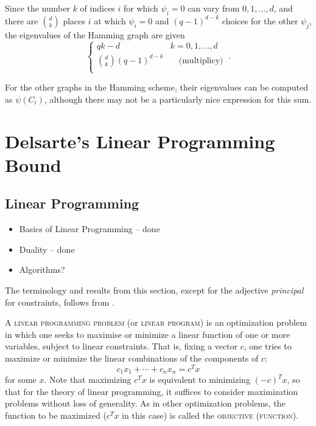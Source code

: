 \documentclass{report}
\begin{document}
    Since the number $k$ of indices $i$ for which $\psi_i = 0$
    can vary from $0, 1, \ldots, d$,
    and there are $\binom{d}{k}$ places $i$ at which $\psi_i = 0$
    and $(q - 1)^{d - k}$ choices for the other $\psi_j$,
    the eigenvalues of the Hamming graph are given
    \begin{equation}
      \begin{cases}
        qk - d & k = 0, 1, \ldots, d \\
        \binom{d}{k}(q - 1)^{d - k} & \quad\text{(multiplicy)} \\
      \end{cases} \ .
    \end{equation}

    For the other graphs in the Hamming scheme, their eigenvalues can be
    computed as $\psi(C_i)$, although there may not be a particularly nice
    expression for this sum.

\chapter{Delsarte's Linear Programming Bound}
  \section{Linear Programming}
    \begin{itemize}
      \item Basics of Linear Programming -- done
      \item Duality -- done
      \item Algorithms?
    \end{itemize}

    The terminology and results from this section,
    except for the adjective \textit{principal} for
    constraints, follows from \cite{matousek}.

    A \textsc{linear programming problem} (or \textsc{linear program})
    is an optimization problem in which one seeks to maximise or minimize
    a linear function of one or more variables, subject to linear constraints.
    That is, fixing a vector $c$, one tries to maximize or minimize
    the linear combinations of the components of $c$:
    $$
      c_1 x_1 + \cdots + c_n x_n = c^T x
    $$
    for some $x$.
    Note that maximizing $c^T x$ is equivalent to minimizing $(-c)^T x$,
    so that for the theory of linear programming,
    it suffices to consider maximization problems without loss of generality.
    As in other optimization problems,
    the function to be maximized ($c^T x$ in this case)
    is called the \textsc{objective (function)}.
\end{document}
